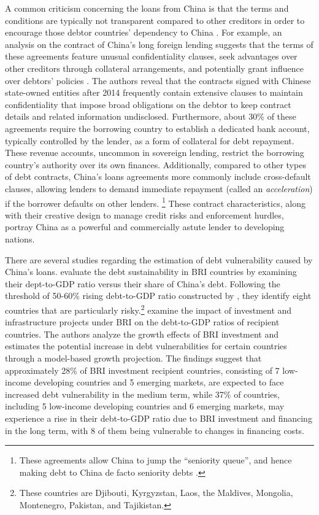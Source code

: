 A common criticism concerning the loans from China is that the terms and conditions are typically not transparent compared to other creditors in order to encourage those debtor countries' dependency to China \citep{tillerson2018us}. For example,
an analysis on the contract of China's long foreign lending suggests that the terms of these agreements feature unusual confidentiality clauses, seek advantages over other creditors through collateral arrangements, and potentially grant influence over debtors' policies \citep{Gelpern-22}.
The authors reveal that the contracts signed with Chinese state-owned entities after 2014 frequently contain extensive clauses to maintain confidentiality that impose broad obligations on the debtor to keep contract details and related information undisclosed. Furthermore, about 30\% of these agreements require the borrowing country to establish a dedicated bank account, typically controlled by the lender, as a form of collateral for debt repayment. These revenue accounts, uncommon in sovereign lending, restrict the borrowing country's authority over its own finances. Additionally, compared to other types of debt contracts, China's loans agreements more commonly include cross-default clauses, allowing lenders to demand immediate repayment (called an \emph{acceleration}) if the borrower defaults on other lenders.%
\footnote{
    These agreements allow China to jump the ``seniority queue'', and hence making debt to China de facto seniority debts \citep{Chen-Muyang-23-china-debt-seniority}.
}
These contract characteristics, along with their creative design to manage credit risks and enforcement hurdles, portray China as a powerful and commercially astute lender to developing nations.

There are several studies regarding the estimation of debt vulnerability caused by China's loans. \citet*{Hurley19-8-debt-trap} evaluate the debt sustainability in BRI countries by examining their dept-to-GDP ratio versus their share of China's debt. Following the threshold of 50-60\% rising debt-to-GDP ratio constructed by \citet{Chudik-15}, they identify eight
countries that are particularly risky.\footnote{
    These countries are Djibouti, Kyrgyzstan, Laos, the Maldives, Mongolia, Montenegro, Pakistan, and Tajikistan.}
\citet*{Bandiera-Vasileios-BRI-debt} examine the impact of investment and infrastructure projects under BRI on the debt-to-GDP ratios of recipient countries. The authors analyze the growth effects of BRI investment and estimates the potential increase in debt vulnerabilities for certain countries through a model-based growth projection. The findings suggest that approximately 28\% of BRI investment recipient countries, consisting of 7 low-income developing countries and 5 emerging markets, are expected to face increased debt vulnerability in the medium term, while 37\% of countries, including 5 low-income developing countries and 6 emerging markets, may experience a rise in their debt-to-GDP ratio due to BRI investment and financing in the long term, with 8 of them being vulnerable to changes in financing costs.


